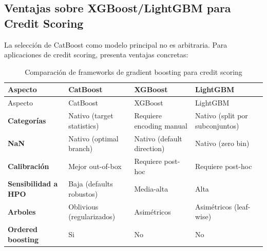 \documentclass[
  spanish,
  11pt,
  letterpaper,
]{scrbook}
\theoremstyle{plain}
\theoremstyle{remark}
\begin{document}
\subsection{Ventajas sobre XGBoost/LightGBM para Credit
Scoring}\label{sec-catboost-advantages}

La selección de CatBoost como modelo principal no es arbitraria. Para
aplicaciones de credit scoring, presenta ventajas concretas:

\begin{longtable}[]{@{}
  >{\raggedright\arraybackslash}p{}
  >{\raggedright\arraybackslash}p{}
  >{\raggedright\arraybackslash}p{}
  >{\raggedright\arraybackslash}p{}@{}}
\caption{Comparación de frameworks de gradient boosting para credit
scoring}\label{tbl-catboost-vs-others}\tabularnewline
\toprule\noalign{}
\begin{minipage}[b]{\linewidth}\raggedright
Aspecto
\end{minipage} & \begin{minipage}[b]{\linewidth}\raggedright
CatBoost
\end{minipage} & \begin{minipage}[b]{\linewidth}\raggedright
XGBoost
\end{minipage} & \begin{minipage}[b]{\linewidth}\raggedright
LightGBM
\end{minipage} \\
\midrule\noalign{}
\endfirsthead
\toprule\noalign{}
\begin{minipage}[b]{\linewidth}\raggedright
Aspecto
\end{minipage} & \begin{minipage}[b]{\linewidth}\raggedright
CatBoost
\end{minipage} & \begin{minipage}[b]{\linewidth}\raggedright
XGBoost
\end{minipage} & \begin{minipage}[b]{\linewidth}\raggedright
LightGBM
\end{minipage} \\
\midrule\noalign{}
\endhead
\bottomrule\noalign{}
\endlastfoot
\textbf{Categorías} & Nativo (target statistics) & Requiere encoding
manual & Nativo (split por subconjuntos) \\
\textbf{NaN} & Nativo (optimal branch) & Nativo (default direction) &
Nativo (zero bin) \\
\textbf{Calibración} & Mejor out-of-box & Requiere post-hoc & Requiere
post-hoc \\
\textbf{Sensibilidad a HPO} & Baja (defaults robustos) & Media-alta &
Alta \\
\textbf{Arboles} & Oblivious (regularizados) & Asimétricos & Asimétricos
(leaf-wise) \\
\textbf{Ordered boosting} & Si & No & No \\
\end{longtable}
\end{document}
